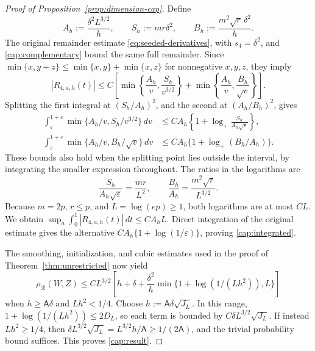 \documentclass[11pt,letterpaper]{article}
\theoremstyle{remark}
\newcommand{\rh}{\rho_{\mathcal R}}
\begin{document}
\begin{proof}[Proof of Proposition~\ref{prop:dimension-cap}]
Define
\[
 A_h:=\frac{\delta^2L^{3/2}}h,\qquad
 S_h:=mr\delta^2,\qquad
 B_h:=\frac{m^2\sqrt r\,\delta^2}h.
\]
The original remainder estimate \eqref{eq:seeded-derivatives}, with
\(s_4=\delta^2\), and \eqref{cap:complementary} bound the same
full remainder. Since \(\min\{x,y+z\}\le
\min\{x,y\}+\min\{x,z\}\) for nonnegative \(x,y,z\), they imply
\[
 |R_{4,a,h}(t)|\le C\left[
 \min\left\{\frac{A_h}v,\frac{S_h}{v^{3/2}}\right\}
 +\min\left\{\frac{A_h}v,\frac{B_h}{\sqrt v}\right\}\right].
\]
Splitting the first integral at \((S_h/A_h)^2\), and the second
at \((A_h/B_h)^2\), gives
\begin{align*}
 \int_\varepsilon^{1+\varepsilon}
       \min\{A_h/v,S_h/v^{3/2}\}\,dv
 &\le CA_h\left\{1+\log_+
                    \frac{S_h}{A_h\sqrt\varepsilon}\right\},\\
 \int_\varepsilon^{1+\varepsilon}
       \min\{A_h/v,B_h/\sqrt v\}\,dv
 &\le CA_h\{1+\log_+(B_h/A_h)\}.
\end{align*}
These bounds also hold when the splitting point lies outside the
interval, by integrating the smaller expression throughout.
The ratios in the logarithms are
\[
 \frac{S_h}{A_h\sqrt\varepsilon}=\frac{mr}{L^2},
 \qquad \frac{B_h}{A_h}=\frac{m^2\sqrt r}{L^{3/2}}.
\]
Because \(m=2p\), \(r\le p\), and \(L=\log(ep)\ge1\), both
logarithms are at most \(CL\). We obtain
\(\sup_a\int_0^1|R_{4,a,h}(t)|\,dt\le CA_hL\).
Direct integration of the original estimate gives the alternative
\(CA_h\{1+\log(1/\varepsilon)\}\), proving
\eqref{cap:integrated}.

The smoothing, initialization, and cubic estimates used in the
proof of Theorem~\ref{thm:unrestricted} now yield
\[
 \rh(W,Z)\le CL^{3/2}\left[
 h+\delta+\frac{\delta^2}h
       \min\{1+\log(1/(Lh^2)),L\}\right]
\]
when \(h\ge\mathsf A\delta\) and \(Lh^2<1/4\). Choose
\(h:=\mathsf A\delta\sqrt{J_L}\). In this range,
\(1+\log(1/(Lh^2))\le2D_L\), so each term is bounded by
\(C\delta L^{3/2}\sqrt{J_L}\).
If instead \(Lh^2\ge1/4\), then
\(\delta L^{3/2}\sqrt{J_L}=L^{3/2}h/\mathsf A
 \ge1/(2\mathsf A)\), and the trivial probability bound suffices.
This proves \eqref{cap:result}.
\end{proof}
\end{document}
